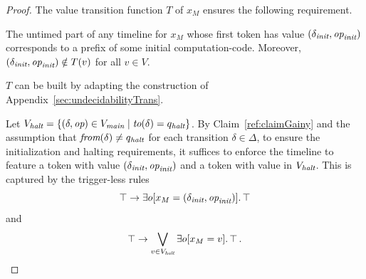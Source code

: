 \begin{proof}
The value transition function $T$ of $x_M$ ensures the following requirement.
\begin{claim}\label{ref:claimGainy}
The untimed part of any timeline for $x_M$ whose first token has value $(\delta_{\textit{init}},{\textit{op}}_{\textit{init}})$ corresponds
 to a prefix of some initial computation-code. Moreover, $(\delta_{\textit{init}},{\textit{op}}_{\textit{init}})\notin T(v)$ for all $v\in V$.
\end{claim}


$T$ can be built by adapting the construction of Appendix~\ref{sec:undecidabilityTrans}. 

Let $V_{\textit{halt}}=\{(\delta,{\textit{op}})\in V_{\textit{main}}\mid {\textit{to}}(\delta)=q_{\textit{halt}}\}$.
 By Claim~\ref{ref:claimGainy} and the assumption that  ${\textit{from}}(\delta)\neq q_{\textit{halt}}$ for each transition $\delta\in \Delta$, to ensure the initialization and halting requirements,
 it suffices  to enforce the timeline to feature a token with value $(\delta_{\textit{init}},{\textit{op}}_{\textit{init}})$ and a token with value in $V_{\textit{halt}}$. This is captured by the trigger-less rules
   \[
   \operatorname{\top} \rightarrow \exists   o[x_M=(\delta_{\textit{init}},{\textit{op}}_{\textit{init}})].  \operatorname{\top}
   \]
   and  
   \[
   \operatorname{\top} \rightarrow \bigvee_{v\in V_{\textit{halt}}} \exists   o[x_M=v].  \operatorname{\top} .
   \]


\end{proof}
